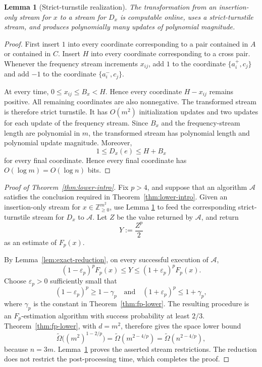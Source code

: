 \documentclass[11pt]{article}
\newtheorem{lemma}[theorem]{Lemma}
\theoremstyle{definition}
\newcommand{\Z}{\mathbb{Z}}
\newcommand{\Fp}{F_p}
\begin{document}
\begin{lemma}[Strict-turnstile realization]\label{lem:strict-realization}
The transformation from an insertion-only stream for \(x\) to a stream for
\(D_x\) is computable online, uses a strict-turnstile stream, and produces
polynomially many updates of polynomial magnitude.
\end{lemma}

\begin{proof}
First insert \(1\) into every coordinate corresponding to a pair contained in
\(A\) or contained in \(C\).  Insert \(H\) into every coordinate
corresponding to a cross pair.  Whenever the frequency stream increments
\(x_{ij}\), add \(1\) to the coordinate \(\{a_i^+,c_j\}\) and add \(-1\) to
the coordinate \(\{a_i^-,c_j\}\).

At every time, \(0\le x_{ij}\le B_x<H\).  Hence every coordinate
\(H-x_{ij}\) remains positive.  All remaining coordinates are also
nonnegative.  The transformed stream is therefore strict turnstile.  It has
\(O(m^2)\) initialization updates and two updates for each update of the
frequency stream.  Since \(B_x\) and the frequency-stream length are
polynomial in \(m\), the transformed stream has polynomial length and
polynomial update magnitude.  Moreover,
\[
 1\le D_x(e)\le H+B_x
\]
for every final coordinate.  Hence every final coordinate has
\(O(\log m)=O(\log n)\) bits.
\end{proof}

\begin{proof}[Proof of Theorem~\ref{thm:lower-intro}]
Fix \(p>4\), and suppose that an algorithm \(\mathcal A\) satisfies the
conclusion required in Theorem~\ref{thm:lower-intro}.  Given an
insertion-only stream for \(x\in\Z_{\ge0}^{m^2}\), use Lemma
\ref{lem:strict-realization} to feed the corresponding strict-turnstile stream
for \(D_x\) to \(\mathcal A\).  Let \(Z\) be the value returned by
\(\mathcal A\), and return
\[
 Y:=\frac{Z^p}{2}
\]
as an estimate of \(\Fp(x)\).

By Lemma~\ref{lem:exact-reduction}, on every successful execution of
\(\mathcal A\),
\[
 (1-\varepsilon_p)^p\Fp(x)
 \le Y\le
 (1+\varepsilon_p)^p\Fp(x).
\]
Choose \(\varepsilon_p>0\) sufficiently small that
\[
 (1-\varepsilon_p)^p\ge1-\gamma_p
 \quad\text{and}\quad
 (1+\varepsilon_p)^p\le1+\gamma_p,
\]
where \(\gamma_p\) is the constant in Theorem~\ref{thm:fp-lower}.  The
resulting procedure is an \(F_p\)-estimation algorithm with success
probability at least \(2/3\).  Theorem~\ref{thm:fp-lower}, with \(d=m^2\),
therefore gives the space lower bound
\[
 \widetilde\Omega\bigl((m^2)^{1-2/p}\bigr)
 =\widetilde\Omega(m^{2-4/p})
 =\widetilde\Omega(n^{2-4/p}),
\]
because \(n=3m\).  Lemma~\ref{lem:strict-realization} proves the asserted
stream restrictions.  The reduction does not restrict the post-processing
time, which completes the proof.
\end{proof}
\end{document}
